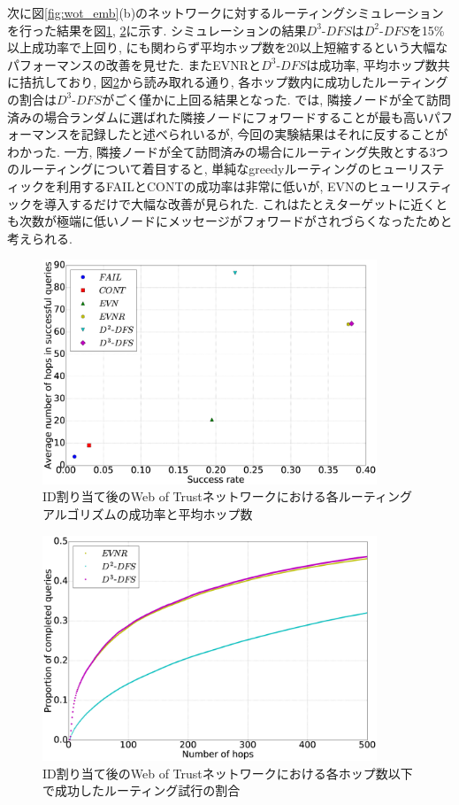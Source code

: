 \documentclass[dvipdfmx]{ampbt}
\begin{document}
   次に図\ref{fig:wot_emb}(b)のネットワークに対するルーティングシミュレーションを行った結果を図\ref{fig:succ_hops_full}, \ref{fig:cml_noclip}に示す.  シミュレーションの結果$D^3$-$DFS$は$D^2$-$DFS$を15\%以上成功率で上回り, にも関わらず平均ホップ数を20以上短縮するという大幅なパフォーマンスの改善を見せた. またEVNRと$D^3$-$DFS$は成功率, 平均ホップ数共に拮抗しており, 図\ref{fig:cml_noclip}から読み取れる通り, 各ホップ数内に成功したルーティングの割合は$D^3$-$DFS$がごく僅かに上回る結果となった. \cite{csimcsek2008navigating}では, 隣接ノードが全て訪問済みの場合ランダムに選ばれた隣接ノードにフォワードすることが最も高いパフォーマンスを記録したと述べられいるが, 今回の実験結果はそれに反することがわかった. \newline
   一方, 隣接ノードが全て訪問済みの場合にルーティング失敗とする3つのルーティングについて着目すると, 単純なgreedyルーティングのヒューリスティックを利用するFAILとCONTの成功率は非常に低いが, EVNのヒューリスティックを導入するだけで大幅な改善が見られた. これはたとえターゲットに近くとも次数が極端に低いノードにメッセージがフォワードがされづらくなったためと考えられる.

   \begin{figure}[htbp]
    \centerline{\includegraphics[width=100mm]{../fig/succ_hops_full.eps}}
    \caption{ID割り当て後のWeb of Trustネットワークにおける各ルーティングアルゴリズムの成功率と平均ホップ数}
    \label{fig:succ_hops_full}
   \end{figure}
   \begin{figure}[htbp]
    \centerline{\includegraphics[width=100mm]{../fig/cml_noclip.eps}}
    \caption{ID割り当て後のWeb of Trustネットワークにおける各ホップ数以下で成功したルーティング試行の割合}
    \label{fig:cml_noclip}
   \end{figure}
\end{document}
